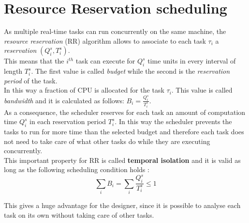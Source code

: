 \section{Resource Reservation scheduling}
As multiple real-time tasks can run concurrently on the same machine, the \emph{resource reservation} (RR) \cite{integratingmultimedia} algorithm allows to associate to each task \( \tau_{i} \) a \emph{reservation} \( \left(Q_{i}^s, T_{i}^s\right) \).\\ 
This means that the \( i^{th} \) task can execute for \( Q_{i}^s \) time units in every interval of length \( T_{i}^s \). The first value is called \emph{budget} while the second is the \emph{reservation period} of the task.\\
In this way a fraction of CPU is allocated for the task \( \tau_{i} \). This value is called \emph{bandwidth} and it is calculated as follows: \( B_{i} = \frac{Q_{i}^s}{T_{i}^s}\).\\
As a consequence, the scheduler reserves for each task an amount of computation time \( Q_{i}^s \) in each reservation period \( T_{i}^s \). In this way the scheduler prevents the tasks to run for more time than the selected budget and therefore each task does not need to take care of what other tasks do while they are executing concurrently.\\
This important property for RR is called \textbf{temporal isolation} and it is valid as long as the following scheduling condition holds \cite{realtimehandbook}:
\begin{equation} \tag{1} \label{schedCond}
  \displaystyle\sum_{i} B_{i} =  \displaystyle\sum_{i} \frac{Q_{i}^s}{T_{i}^s} \leq 1
\end{equation}

This gives a huge advantage for the designer, since it is possible to analyse each task on its own without taking care of other tasks.

